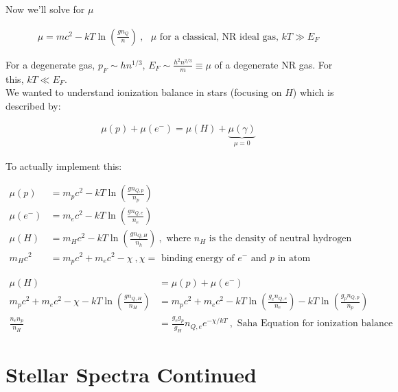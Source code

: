 \documentclass[10pt,letterpaper,final]{book}
\newcommand{\rp}{\right)}
\newcommand{\lp}{\left(}
\begin{document}
Now we'll solve for $\mu$

\begin{align}
\boxed{\mu = mc^2 - kT \ln \lp \frac{gn_Q}{n} \rp} ~,\text{ $\mu$ for a classical, NR ideal gas, }kT \gg E_F
\end{align}

For a degenerate gas, $p_F \sim hn^{1/3}$, $E_F \sim \frac{h^2 n^{2/3}}{m} \equiv \mu$ of a degenerate NR gas. For this, $kT \ll E_F$. \\

We wanted to understand ionization balance in stars (focusing on $H$) which is described by:

\begin{align}
\mu(p) + \mu(e^-) = \mu(H) + \underbrace{\mu(\gamma)}_{\mu = 0}
\end{align}

To actually implement this:

\begin{align}
\mu(p) &= m_pc^2 - kT\ln \lp \frac{gn_{Q,p}}{n_p} \rp\\
\mu(e^-) &= m_ec^2 - kT\ln \lp \frac{gn_{Q,e}}{n_e} \rp\\
\mu(H) &= m_Hc^2 - kT\ln \lp \frac{gn_{Q,H}}{n_h} \rp~,\text{ where $n_H$ is the density of neutral hydrogen}\\
m_Hc^2 &= m_pc^2 + m_ec^2 - \chi~,\chi = \text{ binding energy of $e^-$ and $p$ in atom}
\end{align}

\begin{align}
\mu(H) &= \mu(p) + \mu(e^-)\\
m_pc^2 + m_ec^2 - \chi - kT \ln \lp \frac{gn_{Q,H}}{n_H} \rp &= m_pc^2+m_ec^2 - kT\ln \lp \frac{g_e n_{Q,e}}{n_e} \rp -  kT\ln \lp \frac{g_p n_{Q,p}}{n_p} \rp\\
\frac{n_e  n_p}{n_H} &= \frac{g_eg_p}{g_H}n_{Q,e} e^{-\chi/kT}~,\text{ Saha Equation for ionization balance}
\end{align}


\chapter{Stellar Spectra Continued}
\end{document}
